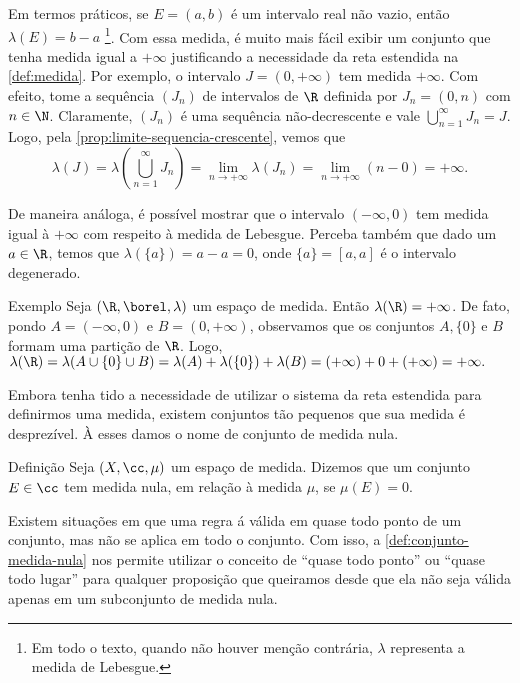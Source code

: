 Em termos práticos, se $E =  (a,b)$ é um intervalo real não vazio, então $\lambda(E) = b - a$
\footnote{
	Em todo o texto, quando não houver menção contrária, $\lambda$ representa a medida de Lebesgue.
}.
Com essa medida, é muito mais fácil exibir um conjunto que tenha medida igual a $+\infty$ justificando a necessidade da reta estendida na \ref{def:medida}.
Por exemplo, o intervalo 
$J = (0, +\infty)$ tem medida $+\infty$.
Com efeito, 
tome a sequência $(J_n)$ de intervalos de $\R$ definida por $J_n = (0, n)$  com $n \in \N$.
Claramente, $(J_n)$ é uma sequência não-decrescente e vale
$\displaystyle
\bigcup_{n = 1}^\infty J_n
=
J
$.
Logo, pela \ref{prop:limite-sequencia-crescente}, vemos que
$$
\lambda(J)
=
\lambda\left(\bigcup_{n = 1}^\infty J_n\right)
=
\lim_{n \to +\infty}\lambda(J_n)
=
\lim_{n \to +\infty}(n - 0)
=
+\infty.
$$

De maneira análoga, é possível mostrar que o intervalo $(-\infty, 0)$ tem medida igual à $+\infty$ com respeito à medida de Lebesgue.
Perceba também que dado um $a \in \R$, temos que
$\lambda(\{a\}) = a - a = 0$, onde $\{a\} = [a,a]$ é o intervalo degenerado.
\begin{env}{Exemplo}
	\label{ex: a medida de R}
	Seja $(\R, \borel, \lambda)$ um espaço de medida.
	Então $\lambda(\R) = +\infty$.
	De fato, pondo $A = (-\infty, 0)$ e $B = (0, +\infty)$, observamos que os conjuntos $A, \{0\}$ e $B$ formam uma partição de $\R$.
	Logo, 
	$
	\lambda(\R)
	=
	\lambda(A \cup \{0\} \cup B)
	= 
	\lambda(A) + \lambda(\{0\}) + \lambda(B)
	=
	(+\infty) + 0 + (+ \infty) 
	=
	+\infty.
	$
\end{env}

Embora tenha tido a necessidade de utilizar o sistema da reta estendida para definirmos uma medida, existem conjuntos tão pequenos que sua medida é desprezível.
À esses damos o nome de conjunto de medida nula.
\begin{env}{Definição}
	\label{def:conjunto-medida-nula}
	Seja $(X, \cc, \mu)$ um espaço de medida.
	Dizemos que um conjunto $E \in \cc$ tem medida nula, em relação à medida $\mu$, se $\mu(E) = 0$.
\end{env}

Existem situações em que uma regra á válida em quase todo ponto de um conjunto, mas não se aplica em todo o conjunto.
Com isso, a \ref{def:conjunto-medida-nula} nos permite utilizar o conceito de \enquote{quase todo ponto} ou \enquote{quase todo lugar} para qualquer proposição que queiramos desde que ela não seja válida apenas em um subconjunto de medida nula.


